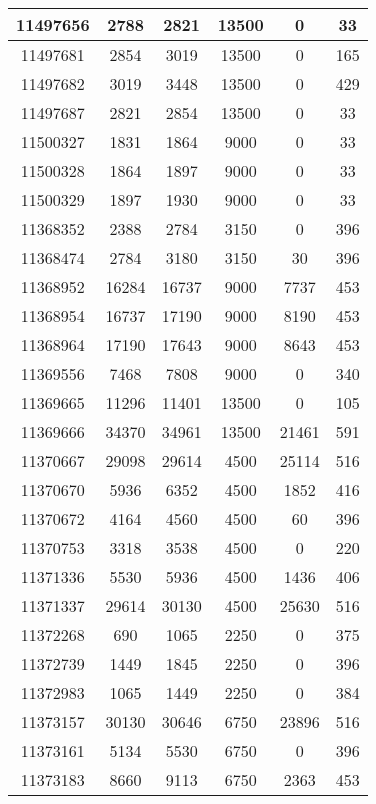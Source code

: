 \begin{appendices}
\begin{center}
\begin{longtable}{|c|c|c|c|c|c|}
11497656 & 2788  & 2821  & 13500 & 0     & 33  \\ \hline
11497681 & 2854  & 3019  & 13500 & 0     & 165 \\ \hline
11497682 & 3019  & 3448  & 13500 & 0     & 429 \\ \hline
11497687 & 2821  & 2854  & 13500 & 0     & 33  \\ \hline
11500327 & 1831  & 1864  & 9000  & 0     & 33  \\ \hline
11500328 & 1864  & 1897  & 9000  & 0     & 33  \\ \hline
11500329 & 1897  & 1930  & 9000  & 0     & 33  \\ \hline
11368352 & 2388  & 2784  & 3150  & 0     & 396 \\ \hline
11368474 & 2784  & 3180  & 3150  & 30    & 396 \\ \hline
11368952 & 16284 & 16737 & 9000  & 7737  & 453 \\ \hline
11368954 & 16737 & 17190 & 9000  & 8190  & 453 \\ \hline
11368964 & 17190 & 17643 & 9000  & 8643  & 453 \\ \hline
11369556 & 7468  & 7808  & 9000  & 0     & 340 \\ \hline
11369665 & 11296 & 11401 & 13500 & 0     & 105 \\ \hline
11369666 & 34370 & 34961 & 13500 & 21461 & 591 \\ \hline
11370667 & 29098 & 29614 & 4500  & 25114 & 516 \\ \hline
11370670 & 5936  & 6352  & 4500  & 1852  & 416 \\ \hline
11370672 & 4164  & 4560  & 4500  & 60    & 396 \\ \hline
11370753 & 3318  & 3538  & 4500  & 0     & 220 \\ \hline
11371336 & 5530  & 5936  & 4500  & 1436  & 406 \\ \hline
11371337 & 29614 & 30130 & 4500  & 25630 & 516 \\ \hline
11372268 & 690   & 1065  & 2250  & 0     & 375 \\ \hline
11372739 & 1449  & 1845  & 2250  & 0     & 396 \\ \hline
11372983 & 1065  & 1449  & 2250  & 0     & 384 \\ \hline
11373157 & 30130 & 30646 & 6750  & 23896 & 516 \\ \hline
11373161 & 5134  & 5530  & 6750  & 0     & 396 \\ \hline
11373183 & 8660  & 9113  & 6750  & 2363  & 453 \\ \hline

\end{longtable}
\end{center}
\end{appendices}
